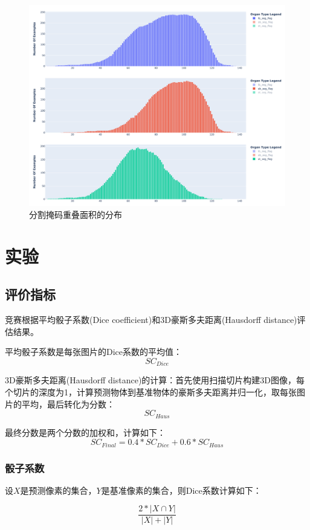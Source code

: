 \documentclass[letterpaper, 10pt, conference, twoside]{ieeeconf}
\begin{document}
\begin{figure}[htbp]
  \centering
  \includegraphics[width = 1\linewidth]{seg_distribution.png}
  \caption{分割掩码重叠面积的分布}
  \label{fig:fig7}
\end{figure}

\section{实验}
\subsection{评价指标}

竞赛根据平均骰子系数(Dice coefficient)和3D豪斯多夫距离(Hausdorff distance)评估结果。

平均骰子系数是每张图片的Dice系数的平均值：
\[SC_{Dice}\]

3D豪斯多夫距离(Hausdorff distance)的计算：首先使用扫描切片构建3D图像，每个切片的深度为1，计算预测物体到基准物体的豪斯多夫距离并归一化，取每张图片的平均，最后转化为分数：
\[ SC_{Haus} \]

最终分数是两个分数的加权和，计算如下：
\[SC_{Final} = 0.4 * SC_{Dice} + 0.6 * SC_{Haus}\]

\subsubsection{骰子系数}

设$X$是预测像素的集合，$Y$是基准像素的集合，则Dice系数计算如下：

\[ \frac{2*|X\cap Y|}{|X|+|Y|}\]
\end{document}
